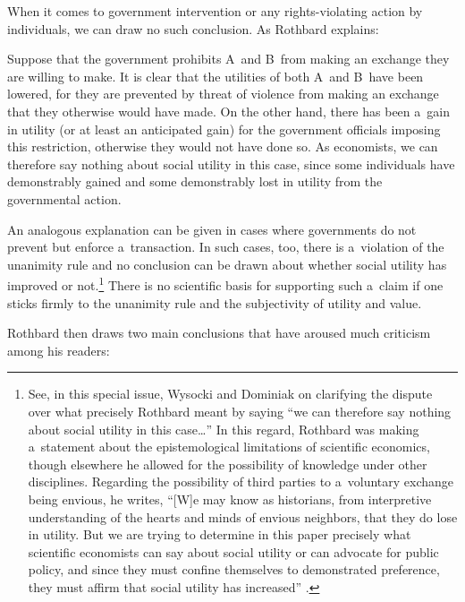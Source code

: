 When it comes to government intervention or any rights-violating action by individuals, we can draw no such conclusion. As Rothbard 
\parencite*[][p.322]{rothbard_toward_2011} %
 explains:



Suppose that the government prohibits A~and B~from making an exchange they are willing to make. It is clear that the utilities of both A~and B~have been lowered, for they are prevented by threat of violence from making an exchange that they otherwise would have made. On the other hand, there has been a~gain in utility (or at least an anticipated gain) for the government officials imposing this restriction, otherwise they would not have done so. As economists, we can therefore say nothing about social utility in this case, since some individuals have demonstrably gained and some demonstrably lost in utility from the governmental action.



An analogous explanation can be given in cases where governments do not prevent but enforce a~transaction. In such cases, too, there is a~violation of the unanimity rule and no conclusion can be drawn about whether social utility has improved or not.\footnote{See, in this special issue, Wysocki and Dominiak 
\parencite*[][]{wysocki_social_2024} %
 on clarifying the dispute over what precisely Rothbard meant by saying ``we can therefore say nothing about social utility in this case…'' In this regard, Rothbard was making a~statement about the epistemological limitations of scientific economics, though elsewhere he allowed for the possibility of knowledge under other disciplines. Regarding the possibility of third parties to a~voluntary exchange being envious, he writes, ``[W]e may know as historians, from interpretive understanding of the hearts and minds of envious neighbors, that they do lose in utility. But we are trying to determine in this paper precisely what scientific economists can say about social utility or can advocate for public policy, and since they must confine themselves to demonstrated preference, they must affirm that social utility has increased'' 
\parencite[][p.89]{rothbard_praxeology_1997}.%
} There is no scientific basis for supporting such a~claim if one sticks firmly to the unanimity rule and the subjectivity of utility and value.



Rothbard 
\parencite*[][p.323]{} %
 then draws two main conclusions that have aroused much criticism among his readers:



